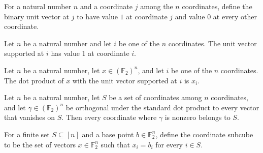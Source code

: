 \begin{definition}
\leanok
For a natural number $n$ and a coordinate $j$ among the $n$ coordinates, define the
binary unit vector at $j$ to have value $1$ at coordinate $j$ and value $0$ at every
other coordinate.
\end{definition}

\begin{theorem}
\leanok
{}
Let $n$ be a natural number and let $i$ be one of the $n$ coordinates. The unit vector
supported at $i$ has value $1$ at coordinate $i$.
\end{theorem}

\begin{theorem}
\leanok
{}
Let $n$ be a natural number, let $x\in(\mathbb{F}_2)^n$, and let $i$ be one of the $n$
coordinates. The dot product of $x$ with the unit vector supported at $i$ is $x_i$.
\end{theorem}

\begin{theorem}
\leanok
{}
Let $n$ be a natural number, let $S$ be a set of coordinates among $n$ coordinates, and
let $\gamma\in(\mathbb{F}_2)^n$ be orthogonal under the standard dot product to every
vector that vanishes on $S$. Then every coordinate where $\gamma$ is nonzero belongs to
$S$.
\end{theorem}

\begin{definition}
\leanok
{}
For a finite set $S\subseteq[n]$ and a base point $b\in\mathbb{F}_2^n$, define the
coordinate subcube to be the set of vectors $x\in\mathbb{F}_2^n$ such that $x_i=b_i$ for
every $i\in S$.
\end{definition}

